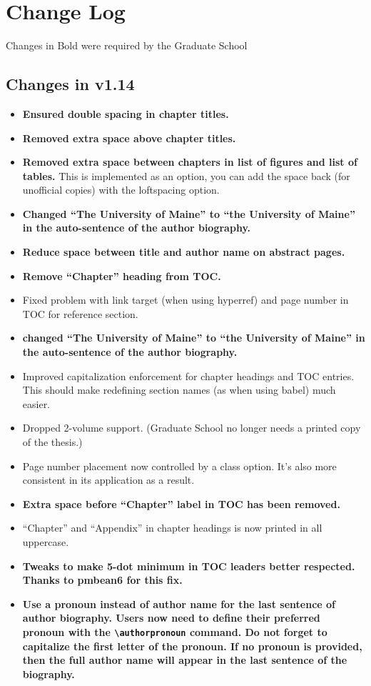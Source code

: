 \chapter{Change Log}
Changes in Bold were required by the Graduate School

\section{Changes in v1.14}
\begin{itemize}
\item{\bfseries Ensured double spacing in chapter titles.}
\item{\bfseries Removed extra space above chapter titles.}
\item{{\bfseries Removed extra space between chapters in list of figures and list of tables.} This is implemented as an option, you can add the space back (for unofficial copies) with the loftspacing option.}
\item{\bfseries Changed ``The University of Maine'' to ``the University of Maine'' in the auto-sentence of the author biography.}
\item{\bfseries Reduce space between title and author name on abstract pages.}
\item{\bfseries Remove “Chapter” heading from TOC.}
\item{Fixed problem with link target (when using hyperref) and page number in TOC for reference section.}
\item{\bfseries changed ``The University of Maine'' to ``the University of Maine'' in the auto-sentence of the author biography.}
\item{Improved capitalization enforcement for chapter headings and TOC entries.  This should make redefining section names (as when using babel) much easier.}
\item{Dropped 2-volume support. (Graduate School no longer needs a printed copy of the thesis.)}
\item{Page number placement now controlled by a class option.  It's also more consistent in its application as a result.}
\item{\bfseries Extra space before ``Chapter'' label in TOC has been removed.}
\item{``Chapter'' and ``Appendix'' in chapter headings is now printed in all uppercase.}
\item{\bfseries Tweaks to make 5-dot minimum in TOC leaders better respected.  Thanks to pmbean6 for this fix.}
\item{\bfseries Use a pronoun instead of author name for the last sentence of author biography.  Users now need to define their preferred pronoun with the \verb=\authorpronoun= command.  Do not forget to capitalize the first letter of the pronoun.  If no pronoun is provided, then the full author name will appear in the last sentence of the biography.}

\end{itemize}

